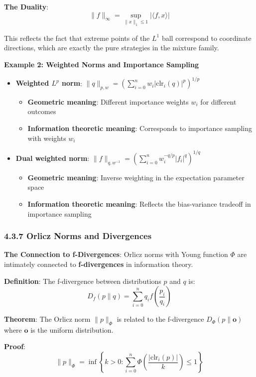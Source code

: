 \documentclass{amsart}
\theoremstyle{plain}
\theoremstyle{definition}
\theoremstyle{remark}
\begin{document}
\textbf{The Duality}:
\[
\|f\|_\infty = \sup_{\|x\|_1 \leq 1} |\langle f, x \rangle|
\]

This reflects the fact that extreme points of the $L^1$ ball correspond to coordinate directions, which are exactly the pure strategies in the mixture family.

\textbf{Example 2: Weighted Norms and Importance Sampling}

\begin{itemize}
	\item \textbf{Weighted $L^p$ norm}: $\|q\|_{p,w} = \left( \sum_{i=0}^n w_i |\text{clr}_i(q)|^p \right)^{1/p}$
	\begin{itemize}
		\item \textbf{Geometric meaning}: Different importance weights $w_i$ for different outcomes
		\item \textbf{Information theoretic meaning}: Corresponds to importance sampling with weights $w_i$
	\end{itemize}
	\item \textbf{Dual weighted norm}: $\|f\|_{q,w^{-1}} = \left( \sum_{i=0}^n w_i^{-q/p} |f_i|^q \right)^{1/q}$
	\begin{itemize}
		\item \textbf{Geometric meaning}: Inverse weighting in the expectation parameter space
		\item \textbf{Information theoretic meaning}: Reflects the bias-variance tradeoff in importance sampling
	\end{itemize}
\end{itemize}

\subsubsection{4.3.7 Orlicz Norms and Divergences}

\textbf{The Connection to f-Divergences}:
Orlicz norms with Young function $\Phi$ are intimately connected to \textbf{f-divergences} in information theory.

\textbf{Definition}: The f-divergence between distributions $p$ and $q$ is:
\[
D_f(p\|q) = \sum_{i=0}^n q_i f\left(\frac{p_i}{q_i}\right)
\]

\textbf{Theorem}: The Orlicz norm $\|p\|_\Phi$ is related to the f-divergence $D_\Phi(p\|\mathbf{o})$ where $\mathbf{o}$ is the uniform distribution.

\textbf{Proof}:
\[
\|p\|_\Phi = \inf \left\{ k > 0 : \sum_{i=0}^n \Phi\left(\frac{|\text{clr}_i(p)|}{k}\right) \leq 1 \right\}
\]
\end{document}
